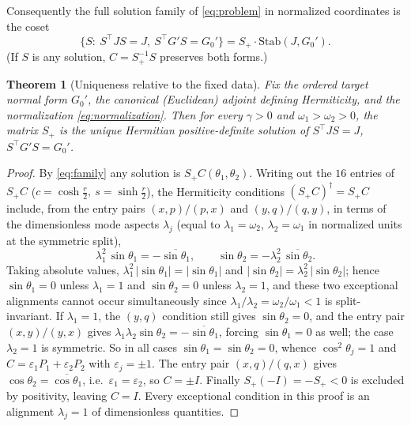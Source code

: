 \documentclass[11pt]{article}
\newtheorem{theorem}{Theorem}[section]
\theoremstyle{definition}
\theoremstyle{remark}
\newcommand{\w}{\omega}
\newcommand{\Stab}{\mathrm{Stab}}
\newcommand{\dg}{\dagger}
\begin{document}
Consequently the full solution family of \eqref{eq:problem} in normalized
coordinates is the coset
\begin{equation}\label{eq:family}
\{S:\ S^{\top}JS=J,\ S^{\top}G'S=G_0'\}
= S_+\cdot\Stab(J,G_0') .
\end{equation}
(If $S$ is any solution, $C=S_+^{-1}S$ preserves both forms.)

\begin{theorem}[Uniqueness relative to the fixed data]\label{thm:uniqueness}
Fix the ordered target normal form $G_0'$, the canonical (Euclidean)
adjoint defining Hermiticity, and the normalization
\eqref{eq:normalization}.  Then for every $\gamma>0$ and $\w_1>\w_2>0$,
the matrix $S_+$ is the unique Hermitian positive-definite solution of
$S^{\top}JS=J$, $S^{\top}G'S=G_0'$.
\end{theorem}

\begin{proof}
By \eqref{eq:family} any solution is $S_+C(\theta_1,\theta_2)$.  Writing out
the $16$ entries of $S_+C$ ($c=\cosh\tfrac r2,\ s=\sinh\tfrac r2$), the
Hermiticity conditions $(S_+C)^{\dg}=S_+C$ include, from the entry pairs
$(x,p)/(p,x)$ and $(y,q)/(q,y)$, in terms of the dimensionless mode
aspects $\lambda_j$ (equal to $\lambda_1=\w_2$, $\lambda_2=\w_1$ in
normalized units at the symmetric split),
\begin{equation}\label{eq:herm}
\lambda_1^2\,\sin\theta_1=-\overline{\sin\theta_1},
\qquad
\sin\theta_2=-\lambda_2^2\,\overline{\sin\theta_2} .
\end{equation}
Taking absolute values, $\lambda_1^2\,|\sin\theta_1|=|\sin\theta_1|$ and
$|\sin\theta_2|=\lambda_2^2\,|\sin\theta_2|$; hence $\sin\theta_1=0$ unless
$\lambda_1=1$ and $\sin\theta_2=0$ unless $\lambda_2=1$, and these two
exceptional alignments cannot occur simultaneously since
$\lambda_1/\lambda_2=\w_2/\w_1<1$ is split-invariant.  If $\lambda_1=1$,
the $(y,q)$ condition still gives $\sin\theta_2=0$, and the entry pair
$(x,y)/(y,x)$ gives
$\lambda_1\lambda_2\sin\theta_2=-\overline{\sin\theta_1}$, forcing
$\sin\theta_1=0$ as well; the case $\lambda_2=1$ is symmetric.  So in all cases
$\sin\theta_1=\sin\theta_2=0$, whence $\cos^2\theta_j=1$ and
$C=\varepsilon_1P_1+\varepsilon_2P_2$ with $\varepsilon_j=\pm1$.  The entry
pair $(x,q)/(q,x)$ gives
$\cos\theta_2=\overline{\cos\theta_1}$, i.e.\
$\varepsilon_1=\varepsilon_2$, so $C=\pm I$.  Finally $S_+(-I)=-S_+<0$ is
excluded by positivity, leaving $C=I$.  Every exceptional condition in
this proof is an alignment $\lambda_j=1$ of dimensionless quantities.
\end{proof}
\end{document}
